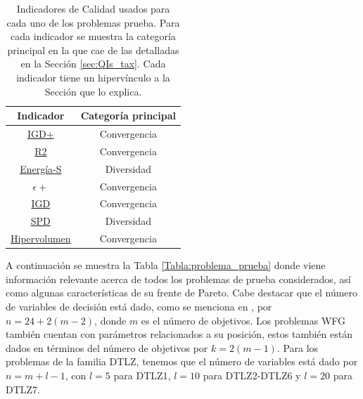 \begin{table}[H]
    \centering
    \begin{tabular}{|c|c|}
    \textbf{Indicador} & \textbf{Categoría principal} \\ \hline
    \hyperref[sec:IGDp]{IGD+}      & Convergencia                  \\
    \hyperref[sec:R2]{R2}         & Convergencia                  \\
    \hyperref[sec:Energía-S]{Energía-S}    & Diversidad                   \\
    \hyperref[sec:Epsilonp]{$\epsilon +$}       & Convergencia                  \\
    \hyperref[sec:IGD]{IGD}       & Convergencia                  \\
    \hyperref[sec:SPD]{SPD}        & Diversidad                   \\
    \hyperref[sec:HV]{Hipervolumen}        & Convergencia                 
    \end{tabular}
    \caption[QI para cada problema]{Indicadores de Calidad usados para cada uno de los problemas prueba. Para cada indicador se muestra la categoría principal en la que cae de las detalladas en la Sección \ref{sec:QIs_tax}. Cada indicador tiene un hipervínculo a la Sección que lo explica.}
    \label{Tabla:QIs}
\end{table}


A continuación se muestra la Tabla \ref{Tabla:problema_prueba} donde viene información relevante acerca de todos los problemas de prueba considerados, así como algunas características de su frente de Pareto. Cabe destacar que el número de variables de decisión está dado, como se menciona en \cite{PFI}, por $n=24+2(m-2)$, donde $m$ es el número de objetivos. Los problemas WFG también cuentan con parámetros relacionados a su posición, estos también están dados en términos del número de objetivos por $k=2(m-1)$. Para los problemas de la familia DTLZ, tenemos que el número de variables está dado por $n=m+l-1$, con $l=5$ para DTLZ1, $l=10$ para DTLZ2-DTLZ6 y $l=20$ para DTLZ7.

